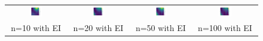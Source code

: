 \documentclass[11pt]{article}
\begin{document}
\begin{figure}[H]
    \centering
    \begin{tabular}{cccc}
        \includegraphics[width=0.225\textwidth]{../Task-02/plots/gp_mean_matern_n10_EI.png} &
        \includegraphics[width=0.225\textwidth]{../Task-02/plots/gp_mean_matern_n20_EI.png} &
        \includegraphics[width=0.225\textwidth]{../Task-02/plots/gp_mean_matern_n50_EI.png} &
        \includegraphics[width=0.225\textwidth]{../Task-02/plots/gp_mean_matern_n100_EI.png} \\
        n=10 with EI & n=20 with EI & n=50 with EI & n=100 with EI \\[0.5em]
        

\end{tabular}
\end{figure}
\end{document}
